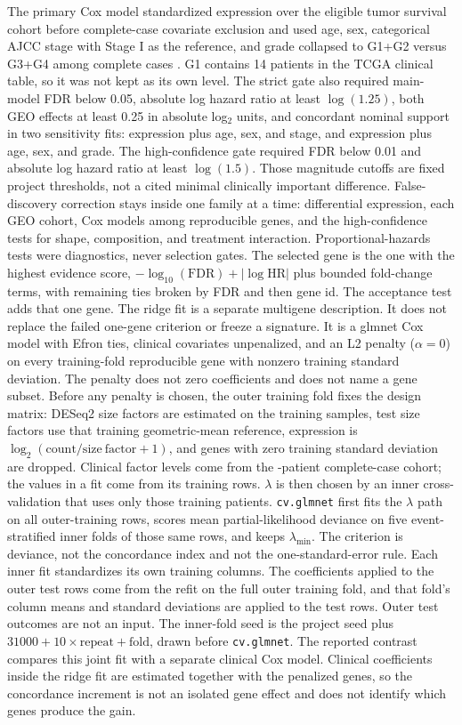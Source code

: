 The primary Cox model standardized expression over the eligible tumor survival cohort before complete-case covariate exclusion and used age, sex, categorical AJCC stage with Stage I as the reference, and grade collapsed to G1+G2 versus G3+G4 among complete cases \cite{cox_1972}. G1 contains 14 patients in the TCGA clinical table, so it was not kept as its own level. The strict gate also required main-model FDR below 0.05, absolute log hazard ratio at least $\log(1.25)$, both GEO effects at least 0.25 in absolute log$_2$ units, and concordant nominal support in two sensitivity fits: expression plus age, sex, and stage, and expression plus age, sex, and grade. The high-confidence gate required FDR below 0.01 and absolute log hazard ratio at least $\log(1.5)$. Those magnitude cutoffs are fixed project thresholds, not a cited minimal clinically important difference. False-discovery correction stays inside one family at a time: differential expression, each GEO cohort, Cox models among reproducible genes, and the high-confidence tests for shape, composition, and treatment interaction. Proportional-hazards tests were diagnostics, never selection gates. The selected gene is the one with the highest evidence score, $-{\log}_{10}(\mathrm{FDR}) + |\log \mathrm{HR}|$ plus bounded fold-change terms, with remaining ties broken by FDR and then gene id. The acceptance test adds that one gene. The ridge fit is a separate multigene description. It does not replace the failed one-gene criterion or freeze a signature. It is a glmnet Cox model with Efron ties, clinical covariates unpenalized, and an L2 penalty ($\alpha=0$) on every training-fold reproducible gene with nonzero training standard deviation. The penalty does not zero coefficients and does not name a gene subset. Before any penalty is chosen, the outer training fold fixes the design matrix: DESeq2 size factors are estimated on the training samples, test size factors use that training geometric-mean reference, expression is $\log_2(\mathrm{count}/\mathrm{size\ factor}+1)$, and genes with zero training standard deviation are dropped. Clinical factor levels come from the \NestedPatients-patient complete-case cohort; the values in a fit come from its training rows. $\lambda$ is then chosen by an inner cross-validation that uses only those training patients. \texttt{cv.glmnet} first fits the $\lambda$ path on all outer-training rows, scores mean partial-likelihood deviance on five event-stratified inner folds of those same rows, and keeps $\lambda_{\min}$. The criterion is deviance, not the concordance index and not the one-standard-error rule. Each inner fit standardizes its own training columns. The coefficients applied to the outer test rows come from the refit on the full outer training fold, and that fold's column means and standard deviations are applied to the test rows. Outer test outcomes are not an input. The inner-fold seed is the project seed plus $31000 + 10\times\mathrm{repeat} + \mathrm{fold}$, drawn before \texttt{cv.glmnet}. The reported contrast compares this joint fit with a separate clinical Cox model. Clinical coefficients inside the ridge fit are estimated together with the penalized genes, so the concordance increment is not an isolated gene effect and does not identify which genes produce the gain.

